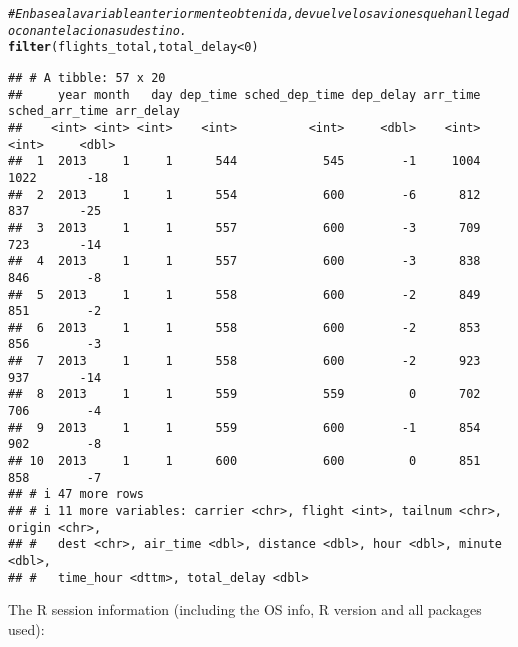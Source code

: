 \documentclass{article}\usepackage[]{graphicx}\usepackage[]{xcolor}
\makeatletter
\newcommand{\hlnum}[1]{\textcolor[rgb]{0.686,0.059,0.569}{#1}}%
\newcommand{\hlcom}[1]{\textcolor[rgb]{0.678,0.584,0.686}{\textit{#1}}}%
\newcommand{\hlopt}[1]{\textcolor[rgb]{0,0,0}{#1}}%
\newcommand{\hlstd}[1]{\textcolor[rgb]{0.345,0.345,0.345}{#1}}%
\newcommand{\hlkwd}[1]{\textcolor[rgb]{0.737,0.353,0.396}{\textbf{#1}}}%
\newenvironment{kframe}{%
 \def\at@end@of@kframe{}%
 \ifinner\ifhmode%
  \def\at@end@of@kframe{\end{minipage}}%
  \begin{minipage}{\columnwidth}%
 \fi\fi%
 \def\FrameCommand##1{\hskip\@totalleftmargin \hskip-\fboxsep
 \colorbox{shadecolor}{##1}\hskip-\fboxsep
     \hskip-\linewidth \hskip-\@totalleftmargin \hskip\columnwidth}%
 \MakeFramed {\advance\hsize-\width
   \@totalleftmargin\z@ \linewidth\hsize
   \@setminipage}}%
 {\par\unskip\endMakeFramed%
 \at@end@of@kframe}
\newenvironment{knitrout}{}{} %
\makeatother
\begin{document}
\begin{knitrout}
\begin{kframe}
\begin{alltt}
\hlcom{# En base a la variable anteriormente obtenida, devuelve los aviones que han llegado con antelacion a su destino.}
\hlkwd{filter}\hlstd{(flights_total,total_delay} \hlopt{<} \hlnum{0}\hlstd{)}
\end{alltt}
\begin{verbatim}
## # A tibble: 57 x 20
##     year month   day dep_time sched_dep_time dep_delay arr_time sched_arr_time arr_delay
##    <int> <int> <int>    <int>          <int>     <dbl>    <int>          <int>     <dbl>
##  1  2013     1     1      544            545        -1     1004           1022       -18
##  2  2013     1     1      554            600        -6      812            837       -25
##  3  2013     1     1      557            600        -3      709            723       -14
##  4  2013     1     1      557            600        -3      838            846        -8
##  5  2013     1     1      558            600        -2      849            851        -2
##  6  2013     1     1      558            600        -2      853            856        -3
##  7  2013     1     1      558            600        -2      923            937       -14
##  8  2013     1     1      559            559         0      702            706        -4
##  9  2013     1     1      559            600        -1      854            902        -8
## 10  2013     1     1      600            600         0      851            858        -7
## # i 47 more rows
## # i 11 more variables: carrier <chr>, flight <int>, tailnum <chr>, origin <chr>,
## #   dest <chr>, air_time <dbl>, distance <dbl>, hour <dbl>, minute <dbl>,
## #   time_hour <dttm>, total_delay <dbl>
\end{verbatim}
\end{kframe}
\end{knitrout}

The R session information (including the OS info, R version and all
packages used):
\end{document}
